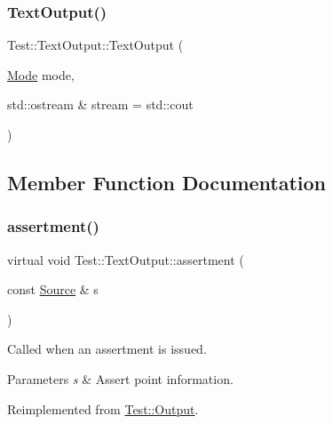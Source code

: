\subsubsection{\texorpdfstring{Text\+Output()}{TextOutput()}}
{\footnotesize\ttfamily Test\+::\+Text\+Output\+::\+Text\+Output (\begin{DoxyParamCaption}\item[{\mbox{\hyperlink{class_test_1_1_text_output_ae7b22c9458e6c566996bf4517c73feb1}{Mode}}}]{mode,  }\item[{std\+::ostream \&}]{stream = {\ttfamily std\+:\+:cout} }\end{DoxyParamCaption})}



\subsection{Member Function Documentation}
\mbox{\label{class_test_1_1_text_output_a8110f86aa00f783fc5a91ec2f59a7998}} 
\subsubsection{\texorpdfstring{assertment()}{assertment()}}
{\footnotesize\ttfamily virtual void Test\+::\+Text\+Output\+::assertment (\begin{DoxyParamCaption}\item[{const \mbox{\hyperlink{class_test_1_1_source}{Source}} \&}]{s }\end{DoxyParamCaption})\hspace{0.3cm}{\ttfamily [virtual]}}

Called when an assertment is issued.


\begin{DoxyParams}{Parameters}
{\em s} & Assert point information. \\
\hline
\end{DoxyParams}


Reimplemented from \mbox{\hyperlink{class_test_1_1_output_a48c31f0baa7627d81939be840c9a7f65}{Test\+::\+Output}}.

\mbox{\label{class_test_1_1_text_output_a9dcf13d9714a2774230386ef3215b701}} 
